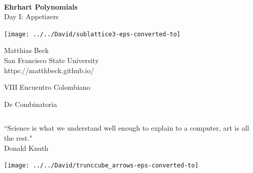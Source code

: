 \documentclass[landscape]{foils}
\def\green{\color{green}}
\def\blue{\color{blue}}
\def\black{\color{black}}
\begin{document}
\setlength{\parindent}{0pt}
\setlength{\parskip}{1cm}

\def\Z{\mathbb{Z}}
\def\Q{\mathbb{Q}}
\def\R{\mathbb{R}}
\def\P{\mathcal{P}}
\def\K{\mathcal{K}}
\def\m{\mathbf{m}}
\def\z{\mathbf{z}}
\newcommand\cone{\operatorname{cone}} 
\newcommand\conv{\operatorname{conv}} 
\newcommand\vol{\operatorname{vol}} 
\newcommand\stir{\operatorname{stirl}}
\newcommand\Ehr{\operatorname{Ehr}} 
\newcommand\fl[1]{\left\lfloor {#1} \right\rfloor} 
\newcommand\fr[1]{\left\{ {#1} \right\}} 


\thispagestyle{empty}
\

\begin{center}
  {\green\LARGE \textbf{Ehrhart Polynomials} \\[12pt]
\normalsize
Day I: Appetizers}
\end{center}

\vspace{-.2in}
\texttt{[image: ../../David/sublattice3-eps-converted-to]}

\vspace{-4.5in} 
\blue
\hspace{5in}
Matthias Beck
\\[5pt]
\black
\hspace{5in}
San Francisco State University
\\[5pt]
\blue
\hspace{5in}
https://matthbeck.github.io/
\black

\vspace{1in} 
\hspace{5in}
VIII Encuentro Colombiano 

\vspace{-.4in} 
\hspace{5in}
De Combinatoria

\black

\newpage
\[  \] 

\vspace{1.5cm} 

``Science is what we understand well enough to explain to a computer, art is all the rest." \\ 

\blue       
Donald Knuth 
\black 

\vspace{-.7in}
\hspace{5in}
\texttt{[image: ../../David/trunccube\_arrows-eps-converted-to]}
\end{document}
